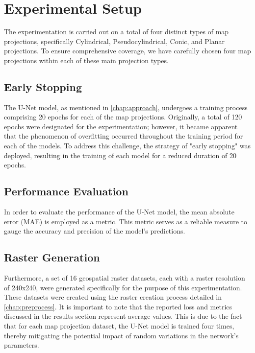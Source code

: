 
\section{Experimental Setup}
The experimentation is carried out on a total of four distinct types of map projections, specifically Cylindrical, Pseudocylindrical, Conic, and Planar projections.
To ensure comprehensive coverage, we have carefully chosen four map projections within each of these main projection types.

\subsection{Early Stopping}
The U-Net model, as mentioned in \autoref{chap:approach}, undergoes a training process comprising 20 epochs for each of the map projections.
Originally, a total of 120 epochs were designated for the experimentation; however, it became apparent that the phenomenon of overfitting occurred throughout the
training period for each of the models. To address this challenge, the strategy of "early stopping" was deployed, resulting in the training of each model for a reduced
duration of 20 epochs.

\subsection{Performance Evaluation}
In order to evaluate the performance of the U-Net model, the mean absolute error (MAE) is employed as a metric. This metric serves as a reliable measure to gauge
the accuracy and precision of the model's predictions.
\subsection{Raster Generation}
Furthermore, a set of 16 geospatial raster datasets, each with a raster resolution of 240x240, were generated specifically for the purpose of this experimentation.
These datasets were created using the raster creation process detailed in \autoref{chap:preprocess}. It is important to note that the reported loss and metrics discussed
in the results section represent average values. This is due to the fact that for each map projection dataset, the U-Net model is trained four times, thereby mitigating
the potential impact of random variations in the network's parameters.
